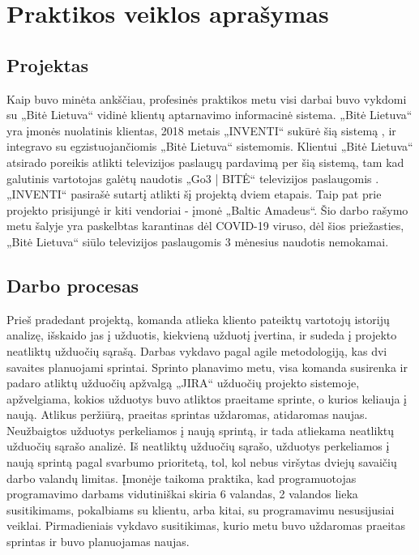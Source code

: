 \section{Praktikos veiklos aprašymas}

\subsection{Projektas}
Kaip buvo minėta ankščiau, profesinės praktikos metu visi darbai buvo vykdomi su „Bitė Lietuva“ vidinė klientų aptarnavimo informacinė sistema.
„Bitė Lietuva“ yra įmonės nuolatinis klientas, 2018 metais „INVENTI“ sukūrė šią sistemą \cite{medus}, ir integravo su egzistuojančiomis „Bitė Lietuva“ sistemomis.
Klientui „Bitė Lietuva“ atsirado poreikis atlikti televizijos paslaugų pardavimą per šią sistemą, tam kad galutinis vartotojas galėtų naudotis
„Go3 | BITĖ“ televizijos paslaugomis \cite{go3}. „INVENTI“ pasirašė sutartį atlikti šį projektą dviem etapais.
Taip pat prie projekto prisijungė ir kiti vendoriai - įmonė „Baltic Amadeus“. Šio darbo rašymo metu šalyje yra paskelbtas karantinas dėl
COVID-19 viruso, dėl šios priežasties, „Bitė Lietuva“ siūlo televizijos paslaugomis 3 mėnesius naudotis nemokamai.

\subsection{Darbo procesas}
Prieš pradedant projektą, komanda atlieka kliento pateiktų vartotojų istorijų analizę, išskaido jas į užduotis, kiekvieną užduotį įvertina, ir sudeda į projekto neatliktų užduočių sąrašą.
Darbas vykdavo pagal agile metodologiją, kas dvi savaites planuojami sprintai. Sprinto planavimo metu, visa komanda susirenka ir padaro atliktų užduočių apžvalgą „JIRA“
užduočių projekto sistemoje, apžvelgiama, kokios užduotys buvo atliktos praeitame sprinte, o kurios keliauja į naują.
Atlikus peržiūrą, praeitas sprintas uždaromas, atidaromas naujas. Neužbaigtos užduotys perkeliamos į naują sprintą, ir tada atliekama neatliktų užduočių sąrašo analizė.
Iš neatliktų užduočių sąrašo, užduotys perkeliamos į naują sprintą pagal svarbumo prioritetą, tol, kol nebus viršytas dviejų savaičių darbo valandų limitas. Įmonėje taikoma praktika,
kad programuotojas programavimo darbams vidutiniškai skiria 6 valandas, 2 valandos lieka susitikimams, pokalbiams su klientu, arba kitai, su programavimu nesusijusiai veiklai.
Pirmadieniais vykdavo susitikimas, kurio metu buvo uždaromas praeitas sprintas ir buvo planuojamas naujas.

